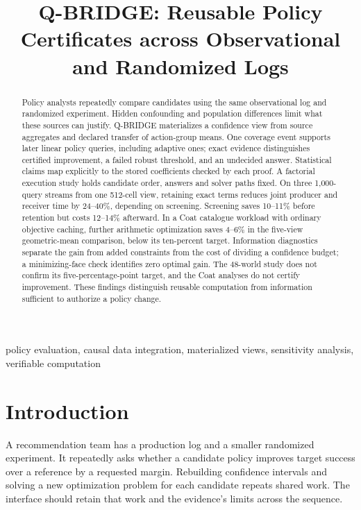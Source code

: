 \documentclass[conference]{IEEEtran}
\title{Q-BRIDGE: Reusable Policy Certificates across Observational and Randomized Logs}
\begin{document}
\maketitle
\begin{abstract}
Policy analysts repeatedly compare candidates using the same observational log and randomized experiment. Hidden confounding and population differences limit what these sources can justify. Q-BRIDGE materializes a confidence view from source aggregates and declared transfer of action-group means. One coverage event supports later linear policy queries, including adaptive ones; exact evidence distinguishes certified improvement, a failed robust threshold, and an undecided answer. Statistical claims map explicitly to the stored coefficients checked by each proof. A factorial execution study holds candidate order, answers and solver paths fixed. On three 1,000-query streams from one 512-cell view, retaining exact terms reduces joint producer and receiver time by 24--40\%, depending on screening. Screening saves 10--11\% before retention but costs 12--14\% afterward. In a Coat catalogue workload with ordinary objective caching, further arithmetic optimization saves 4--6\% in the five-view geometric-mean comparison, below its ten-percent target. Information diagnostics separate the gain from added constraints from the cost of dividing a confidence budget; a minimizing-face check identifies zero optimal gain. The 48-world study does not confirm its five-percentage-point target, and the Coat analyses do not certify improvement. These findings distinguish reusable computation from information sufficient to authorize a policy change.
\end{abstract}
\begin{IEEEkeywords}
policy evaluation, causal data integration, materialized views, sensitivity analysis, verifiable computation
\end{IEEEkeywords}

\section{Introduction}
A recommendation team has a production log and a smaller randomized experiment. It repeatedly asks whether a candidate policy improves target success over a reference by a requested margin. Rebuilding confidence intervals and solving a new optimization problem for each candidate repeats shared work. The interface should retain that work and the evidence's limits across the sequence.
\end{document}
